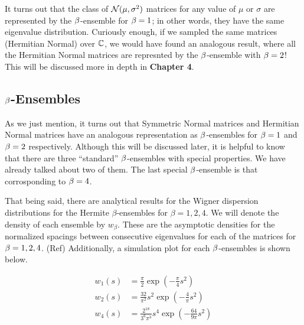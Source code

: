It turns out that the class of $\mathcal{N}(\mu,\sigma^2)$ matrices for any value of $\mu$ or $\sigma$ are represented by the $\beta$-ensemble for $\beta = 1$;
in other words, they have the same eigenvalue distribution.
Curiously enough, if we sampled the same matrices (Hermitian Normal) over $\mathbb{C}$, we would have found an analogous result, where all the Hermitian Normal
matrices are represnted by the $\beta$-ensemble with $\beta = 2$! This will be discussed more in depth in \textbf{Chapter 4}.

\newpage
\subsection{$\beta$-Ensembles}

As we just mention, it turns out that Symmetric Normal matrices and Hermitian Normal matrices have an analogous representation as $\beta$-ensembles for $\beta = 1$ and $\beta = 2$ respectively. Although this will be discussed later, it is helpful to know that there are three ``standard'' $\beta$-ensembles with special properties. We have already talked about two of them. The last special $\beta$-ensemble is that corrosponding to $\beta = 4$.

That being said, there are analytical results for the Wigner dispersion distributions for the Hermite $\beta$-ensembles for $\beta = 1, 2, 4$.
We will denote the density of each ensemble by $w_\beta$. These are the asymptotic densities for the normalized spacings between consecutive eigenvalues for each of the matrices for $\beta = 1,2,4$. (Ref) Additionally, a simulation plot for each $\beta$-ensembles is shown below.

\begin{align*}
  w_1(s) &= \frac{\pi}{2} \exp(-\frac{\pi}{4}s^2) \\
  w_2(s) &= \frac{32}{\pi^2} s^2 \exp(-\frac{4}{\pi}s^2) \\
  w_4(s) &= \frac{2^{18}}{3^{6}\pi^3} s^4 \exp(-\frac{64}{9\pi}s^2)
\end{align*}

\trim
{}%

\newpage

